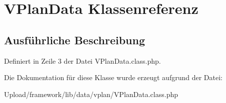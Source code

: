 \hypertarget{class_v_plan_data}{}\section{V\+Plan\+Data Klassenreferenz}
\label{class_v_plan_data}


\subsection{Ausführliche Beschreibung}


Definiert in Zeile 3 der Datei V\+Plan\+Data.\+class.\+php.



Die Dokumentation für diese Klasse wurde erzeugt aufgrund der Datei\+:\begin{DoxyCompactItemize}
\item 
Upload/framework/lib/data/vplan/V\+Plan\+Data.\+class.\+php\end{DoxyCompactItemize}
